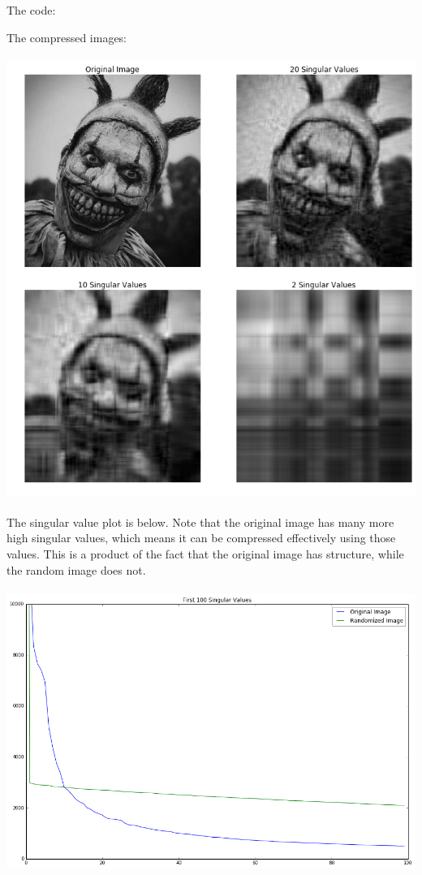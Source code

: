 \documentclass[12pt,letterpaper,fleqn]{hmcpset}
\begin{document}
The code:

The compressed images:\\\\
\includegraphics[scale = .5]{p5comp.png}\\\\
The singular value plot is below. Note that the original image has many more high singular values, which means it can be compressed effectively using those values. This is a product of the fact that the original image has structure, while the random image does not.\\\\
\includegraphics[scale = .5]{p5rand.png}\\\\
\end{document}
